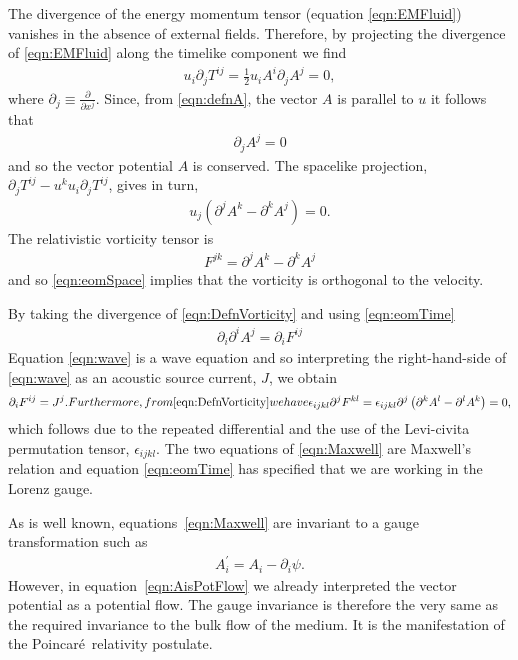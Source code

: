 \documentclass[10pt, fleqn,final,showtrims,oldfontcommands, article,a4paper,oneside]{memoir} %
\newcommand{\sub}[1]{\begin{subequations}#1\end{subequations}}
\newcommand{\eqa}[1]{\begin{align}#1\end{align}}
\newcommand{\eqal}[2]{\begin{align}#1\label{eqn:#2}\end{align}}
\newcommand{\eqnref}[1]{\ref{eqn:#1}}
\newcommand{\lr}[1]{\left( #1 \right)}
\renewcommand{\d}{\partial}
\newcommand{\del}{\nabla}
\newcommand{\scope}[1]{\tilde{#1}}
\newcommand{\half}{\tfrac{1}{2}}
\newcommand{\Poincare}{Poincar{\'e}}
\begin{document}
The divergence of the energy momentum tensor (equation \eqnref{EMFluid}) vanishes in the absence of external fields.
Therefore, by projecting the divergence of \eqnref{EMFluid} along the timelike component we find
\eqa{
  u_i \d_j T^{i j} = \half u_i A^i \d_j A^j = 0,
}
where $\d_j \equiv \frac{\d}{\d x^j}$.
Since, from \eqnref{defnA}, the vector $A$ is parallel to $u$  it follows that 
\eqal{
  \d_j A^j = 0
}{eomTime}
and so the vector potential $A$ is conserved.
The spacelike projection,
$\d_j T^{i j} - u^k u_i \d_j T^{i j}$, gives in turn,
\eqal{
u_j \lr{\d^j A^k - \d^k A^j} = 0.
}{eomSpace}
The relativistic vorticity tensor is 
\eqal{
F^{j k} =\d^j A^k - \d^k A^j
}{DefnVorticity}
and so \eqnref{eomSpace} implies that the vorticity is orthogonal to the velocity.

By taking the divergence of \eqnref{DefnVorticity} and using \eqnref{eomTime} 
\eqal{
  \d_i \d^i A^j = \d_i F^{i j}
}{wave}
Equation \eqnref{wave} is a wave equation and so interpreting the right-hand-side of \eqnref{wave} as an acoustic source current, $J$, we obtain
\sub{
\label{eqn:Maxwell}
\eqa{
  \d_i F^{i j} = J^j.
}
Furthermore, from \eqnref{DefnVorticity} we have
\begin{align}
  \epsilon_{i j k l} \d^j F^{k l} = \epsilon_{i j k l} \d^j \lr{\d^k A^l - \d^l A^k} = 0,
\end{align}
}
which follows due to the repeated differential and the use of the Levi-civita permutation tensor, $\epsilon_{i j k l}$.
The two equations of \eqnref{Maxwell} are Maxwell's relation and equation \eqnref{eomTime} has specified that we are working in the Lorenz gauge.

As is well known, equations~\eqnref{Maxwell} are invariant to a gauge transformation such as
\begin{align}
  A_i^\prime = A_i - \d_i \psi.
\end{align}
However, in equation~\eqnref{AisPotFlow} we already interpreted the vector potential as a potential flow.
The gauge invariance is therefore the very same as the required invariance to the bulk flow of the medium.
It is the manifestation of the \Poincare\ relativity postulate.
\end{document}
